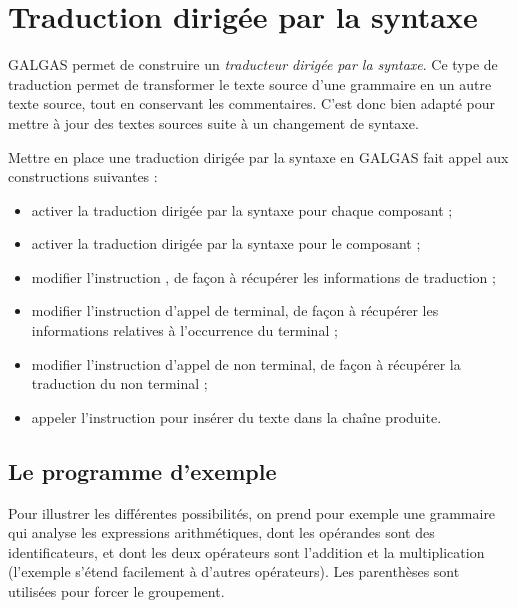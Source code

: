 
\chapter{Traduction dirigée par la syntaxe}

GALGAS permet de construire un \emph{traducteur dirigée par la syntaxe}. Ce type de traduction permet de transformer le texte source d'une grammaire en un autre texte source, tout en conservant les commentaires. C'est donc bien adapté pour mettre à jour des textes sources suite à un changement de syntaxe.

Mettre en place une traduction dirigée par la syntaxe en GALGAS fait appel aux constructions suivantes :
\begin{itemize}
  \item activer la traduction dirigée par la syntaxe pour chaque composant  ;
  \item activer la traduction dirigée par la syntaxe pour le composant  ;
  \item modifier l'instruction , de façon à récupérer les informations de traduction ;
  \item modifier l'instruction d'appel de terminal, de façon à récupérer les informations relatives à l'occurrence du terminal ;
  \item modifier l'instruction d'appel de non terminal, de façon à récupérer la traduction du non terminal ;
  \item appeler l'instruction  pour insérer du texte dans la chaîne produite.
\end{itemize}








\section{Le programme d'exemple}

Pour illustrer les différentes possibilités, on prend pour exemple une grammaire qui analyse les expressions arithmétiques, dont les opérandes sont des identificateurs, et dont les deux opérateurs sont l'addition et la multiplication (l'exemple s'étend facilement à d'autres opérateurs). Les parenthèses sont utilisées pour forcer le groupement.

